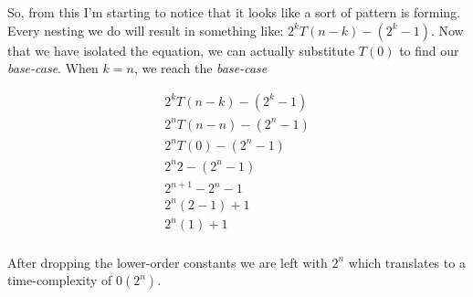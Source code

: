 \documentclass{article}
\begin{document}
So, from this I'm starting to notice that it looks like a sort of pattern is forming. Every nesting
we do will result in something like:  \textbf{$2^k T(n-k) - (2^k-1)$}. Now that we have isolated the equation,
we can actually substitute $T(0)$ to find our \textit{base-case}. When $k = n$, we reach the \textit{base-case}

\begin{equation}
    \begin{split}
         2^k T(n-k) - (2^k-1) \\
         2^n T(n-n) - (2^n-1) \\
         2^n T(0) - (2^n-1) \\
         2^n 2 - (2^n-1) \\
         2^{n+1} -2^n  -1 \\
         2^{n}(2 - 1) + 1 \\
         2^{n}(1) + 1\\
     \end{split} 
\end{equation}

After dropping the lower-order constants we are left with $2^n$ which translates to a time-complexity
of $0(2^n)$.
\end{document}
